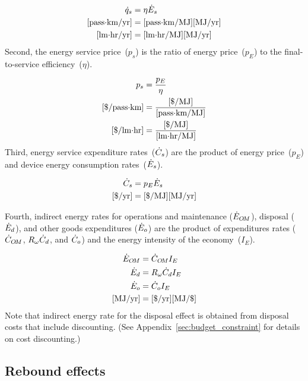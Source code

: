 \documentclass[12pt]{article}\usepackage[]{graphicx}\usepackage[]{xcolor}
\begin{document}
\begin{align} \label{eq:typ_qs_eta_Edot}
  \dot{q}_s &= \eta \dot{E}_s \\
  \text{[pass$\cdot$km/yr]} &= \text{[pass$\cdot$km/MJ]} \text{[MJ/yr]} \nonumber \\
  \text{[lm$\cdot$hr/yr]} &= [\text{lm$\cdot$hr/MJ}] \text{[MJ/yr]} \nonumber
\end{align}
%
Second, the energy service price~($p_s$) is the ratio of energy price~($p_E$) 
to the final-to-service efficiency~($\eta$).

\begin{align} \label{eq:ps_pE_eta}
  p_s &= \frac{p_E}{\eta} \\
  \text{[\$/pass$\cdot$km]} &= \frac{[\$/\text{MJ}]}{\text{[pass$\cdot$km/MJ]}} \nonumber \\
  \text{[\$/lm$\cdot$hr]} &= \frac{[\$/\text{MJ}]}{\text{[lm$\cdot$hr/MJ]}} \nonumber
\end{align}
%
Third, energy service expenditure rates~($\dot{C}_s$) are the product 
of energy price~($p_E$) and device energy consumption rates~($\dot{E}_s$).

\begin{align}
  \dot{C}_s &= p_E \dot{E}_s \\
  \text{[\$/yr]} &= \text{[\$/MJ]}\text{[MJ/yr]} \nonumber
\end{align}

Fourth, indirect energy rates for
operations and maintenance ($\dot{E}_{O\!M}$), 
disposal ($\dot{E}_d$), and
other goods expenditures ($\dot{E}_{o}$)
are the product 
of expenditures rates
($\dot{C}_{O\!M}$, $R_{\omega}\dot{C}_d$, and $\dot{C}_o$) and
the energy intensity of the economy~($I_E$).

\begin{align} \label{eq:indirect_energy_rates}
  \dot{E}_{O\!M} &= \dot{C}_{O\!M} I_E \\
  \dot{E}_d     &= R_{\omega} \dot{C}_d I_E \\
  \dot{E}_o     &= \dot{C}_o I_E \\
  \text{[MJ/yr]} &= \text{[\$/yr]}\text{[MJ/\$]} \nonumber
\end{align}
%
Note that indirect energy rate for the disposal effect
is obtained from disposal costs that include discounting.
(See Appendix~\ref{sec:budget_constraint} for details on cost discounting.)


\subsection{Rebound effects}
\label{sec:rebound_effects}
\end{document}
